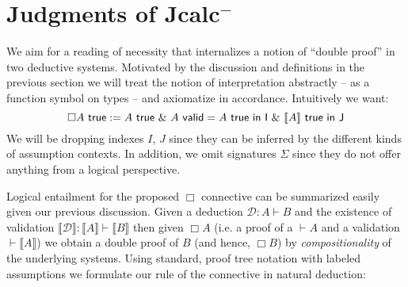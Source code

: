 \section{Judgments of Jcalc$^{-}$}
\label{lsjcalc}

We aim for a reading of necessity that internalizes a notion of ``double proof''  in two deductive systems.
Motivated by the discussion and definitions in the previous section we will treat the notion of interpretation abstractly -- as a function symbol on types -- 
and axiomatize in accordance. Intuitively we want:
$$\Box  A\  {\sf true} :=  A\ {\sf true}\   \& \ A\ {\sf valid} = A{\sf\  true\  in\  I}\  \& \  \llbracket  A \rrbracket \ {\sf true\  in\  J}$$
We will be dropping indexes $I$, $J$ since they can be inferred by the different kinds of assumption  contexts. In addition, we  omit signatures 
$\Sigma$ since they do not offer anything from a logical perspective.

Logical entailment for the proposed  $\Box$ connective can be  summarized  easily given our previous discussion.
Given a deduction $\mathcal{D}:A \vdash B$ and  the existence of validation $\llbracket\mathcal{D}\rrbracket:\llbracket A \rrbracket\vdash \llbracket B\rrbracket$ then 
given $\Box A$ (i.e.  a proof of a  $\vdash A$ and a validation $\vdash \llbracket A \rrbracket$)
we obtain a double proof of $B$ (and hence, $\Box B$) by \textit{compositionality} of the underlying systems.  
Using standard, proof tree notation with labeled assumptions we formulate our rule of the connective in natural deduction:


